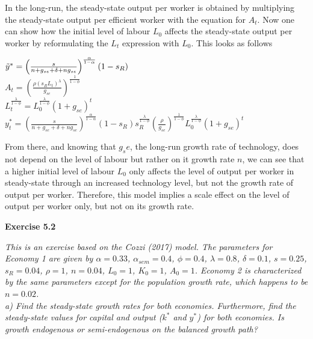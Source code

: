 \documentclass[11pt]{article} %
\begin{document}
In the long-run, the steady-state output per worker is obtained by multiplying the steady-state output per efficient worker with the equation for $A_t$. Now one can show how the initial level of labour $L_0$ affects the steady-state output per worker by reformulating the $L_t$ expression with $L_0$. This looks as follows
\begin{center}
$\Tilde{y}^* = \left(\frac{s}{n+g_{se}+\delta+ng_{se}}\right)^{\frac{\alpha}{1-\alpha}}(1-s_{R})$ \\
$A_t = (\frac{\rho(s_{R}L_{t})^{\lambda}}{g_{se}})^{\frac{1}{1-\phi}}$\\
$L_t^{\frac{\lambda}{1-\phi}} = L_0^{\frac{\lambda}{1-\phi}}(1+g_{se})^t$\\
$y_t^* = \left(\frac{s}{n+g_{se}+\delta+ng_{se}}\right)^{\frac{\alpha}{1-\alpha}}(1-s_{R})s_R^{\frac{\lambda}{1-\phi}}\left(\frac{\rho}{g_{se}} \right)^{\frac{1}{1-\phi}}L_0^{\frac{\lambda}{1-\phi}}(1+g_{se})^t $\\
\end{center}
From there, and knowing that $g_se$, the long-run growth rate of technology, does not depend on the level of labour but rather on it growth rate $n$, we can see that a higher initial level of labour $L_0$ only affects the level of output per worker in steady-state through an increased technology level, but not the growth rate of output per worker. Therefore, this model implies a scale effect on the level of output per worker only, but not on its growth rate.





\pagebreak
\textbf{\Large{Exercise 5.2}}

\textit{This is an exercise based on the Cozzi (2017) model. The parameters for Economy 1 are given by $\alpha = 0.33$, $\alpha_{sem} = 0.4$, $\phi = 0.4$, $\lambda = 0.8$, $\delta=0.1$, $s=0.25$, $s_R =0.04$, $\rho=1$, $n = 0.04$, $L_0 = 1$, $K_0 = 1$, $A_0 = 1$. Economy 2 is characterized by the same parameters except for the population growth rate, which happens to be $n = 0.02$.}\\

\textit{a) Find the steady-state growth rates for both economies. Furthermore, find the steady-state values for capital and output ($k^*$ and $y^*$) for both economies. Is growth endogenous or semi-endogenous on the balanced growth path?}\par
\end{document}
